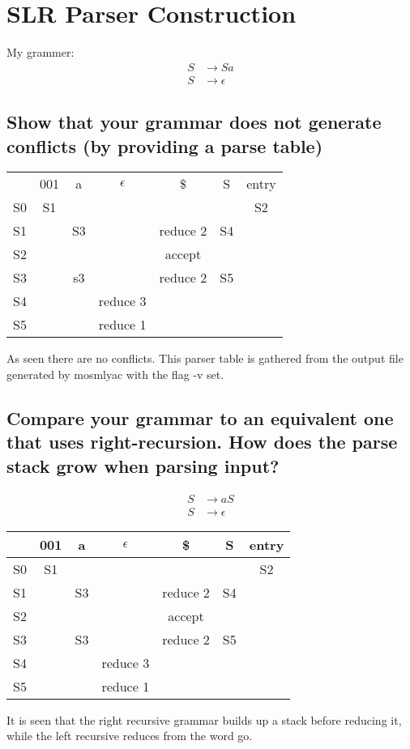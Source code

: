 \documentclass{article}
\begin{document}
\section{SLR Parser Construction}
My grammer:
\begin{align*}
S &\rightarrow Sa\\
S &\rightarrow \epsilon
\end{align*}

\subsection{Show that your grammar does not generate conflicts (by providing a parse table)}
\begin{table}[h]
\begin{center}
\begin{tabular}{|c|c|c|c|c|c|c|}
\hline
& 001 & a & \(\epsilon\) & \$ & S & entry\\
S0 & S1 &  & & & & S2\\
\hline 
S1 & & S3 & & reduce 2 & S4 & \\
\hline
S2 & & & & accept & & \\
\hline
S3 & & s3 & & reduce 2 & S5 & \\
\hline
S4 & & & reduce 3 & & & \\
\hline
S5 & & & reduce 1 & & & \\
\hline 
\end{tabular}
\end{center}
\end{table}

As seen there are no conflicts. This parser table is gathered from the output file generated by mosmlyac with the flag -v set.
\subsection{Compare your grammar to an equivalent one that uses right-recursion. How does the parse stack grow when parsing input?}

\begin{align*}
S &\rightarrow aS\\
S &\rightarrow \epsilon
\end{align*}

\begin{table}[h]
\begin{center}
\begin{tabular}{|c|c|c|c|c|c|c|}
\hline
& 001 & a & \(\epsilon\) & \$ & S & entry\\
\hline
S0 & S1 &  & & & & S2\\
\hline
S1 & & S3 & & reduce 2 & S4 & \\
\hline
S2 & & & & accept & & \\
\hline
S3 & & S3 & & reduce 2 & S5 & \\
\hline
S4 & & & reduce 3 & & & \\
\hline
S5 & & & reduce 1 & & & \\
\hline
\end{tabular}
\end{center}
\end{table}
It is seen that the right recursive grammar builds up a stack before reducing it, while the left recursive reduces from the word go. 
\end{document}
